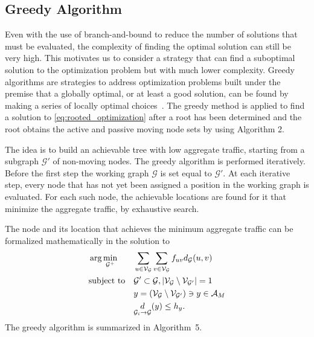 \documentclass[10pt,conference]{IEEEtran}
\begin{document}
\subsection{Greedy Algorithm}
\label{sec:ga}


Even with the use of branch-and-bound to reduce the number of
solutions that must be evaluated, the complexity of finding the
optimal solution can still be very high.  This motivates us to
consider a strategy that can find a suboptimal solution to the
optimization problem but with much lower complexity.  Greedy
algorithms are strategies to address optimization problems built under
the premise that a globally optimal, or at least a good solution, can
be found by making a series of locally optimal
choices~\cite{CLRbook,Gutin}.  The greedy method is applied to find a
solution to \eqref{eq:rooted_optimization} after a root has been
determined and the root obtains the active and passive moving node
sets by using Algorithm 2.

The idea is to build an achievable tree with low aggregate traffic,
starting from a subgraph $\mathcal{G}'$ of non-moving nodes.  The
greedy algorithm is performed iteratively.  Before the first step the
working graph $\mathcal{G}$ is set equal to $\mathcal{G}'$.  At each
iterative step, every node that has not yet been assigned a position
in the working graph is evaluated.  For each such node, the achievable
locations are found for it that minimize the aggregate traffic, by
exhaustive search.


The node and its location that achieves the minimum aggregate traffic
can be formalized mathematically in the solution to
\begin{equation}
\label{eq:min_2}
\begin{aligned}
&\arg \min_{\mathcal{G}^{+}}&&\sum_{u \in \mathcal{V}_{\mathcal{G}}}\sum_{v \in
\mathcal{V}_{\mathcal{G}}}f_{uv}d_{\mathcal{G}}(u,v)\\
&\text{subject to} &&\mathcal{G}' \subset \mathcal{G}, |\mathcal{V}_{\mathcal{G}} \setminus \mathcal{V}_{\mathcal{G}'}| = 1\\
&&&y = (\mathcal{V}_{\mathcal{G}} \setminus
\mathcal{V}_{\mathcal{G}'}) \ni y \in \mathcal{A}_M  \\
&&&\underset{\mathcal{G}_{i} \rightarrow \mathcal{G}}{d}(y) \leq h_{y}.\\
\end{aligned}
\end{equation}
The greedy algorithm is summarized in Algorithm~5.
\end{document}

